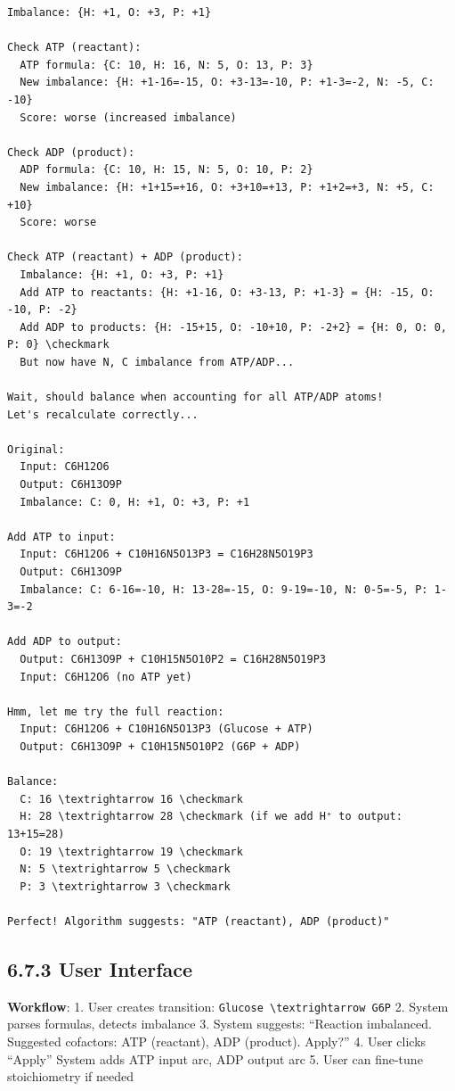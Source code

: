 \begin{lstlisting}
Imbalance: {H: +1, O: +3, P: +1}

Check ATP (reactant):
  ATP formula: {C: 10, H: 16, N: 5, O: 13, P: 3}
  New imbalance: {H: +1-16=-15, O: +3-13=-10, P: +1-3=-2, N: -5, C: -10}
  Score: worse (increased imbalance)

Check ADP (product):
  ADP formula: {C: 10, H: 15, N: 5, O: 10, P: 2}
  New imbalance: {H: +1+15=+16, O: +3+10=+13, P: +1+2=+3, N: +5, C: +10}
  Score: worse

Check ATP (reactant) + ADP (product):
  Imbalance: {H: +1, O: +3, P: +1}
  Add ATP to reactants: {H: +1-16, O: +3-13, P: +1-3} = {H: -15, O: -10, P: -2}
  Add ADP to products: {H: -15+15, O: -10+10, P: -2+2} = {H: 0, O: 0, P: 0} \checkmark
  But now have N, C imbalance from ATP/ADP...
  
Wait, should balance when accounting for all ATP/ADP atoms!
Let's recalculate correctly...

Original:
  Input: C6H12O6
  Output: C6H13O9P
  Imbalance: C: 0, H: +1, O: +3, P: +1

Add ATP to input:
  Input: C6H12O6 + C10H16N5O13P3 = C16H28N5O19P3
  Output: C6H13O9P
  Imbalance: C: 6-16=-10, H: 13-28=-15, O: 9-19=-10, N: 0-5=-5, P: 1-3=-2

Add ADP to output:
  Output: C6H13O9P + C10H15N5O10P2 = C16H28N5O19P3
  Input: C6H12O6 (no ATP yet)
  
Hmm, let me try the full reaction:
  Input: C6H12O6 + C10H16N5O13P3 (Glucose + ATP)
  Output: C6H13O9P + C10H15N5O10P2 (G6P + ADP)
  
Balance:
  C: 16 \textrightarrow 16 \checkmark
  H: 28 \textrightarrow 28 \checkmark (if we add H⁺ to output: 13+15=28)
  O: 19 \textrightarrow 19 \checkmark
  N: 5 \textrightarrow 5 \checkmark
  P: 3 \textrightarrow 3 \checkmark

Perfect! Algorithm suggests: "ATP (reactant), ADP (product)"
\end{lstlisting}

\hypertarget{user-interface}{%
\subsection{6.7.3 User Interface}\label{user-interface}}

\textbf{Workflow}: 1. User creates transition:
\passthrough{\lstinline!Glucose \textrightarrow G6P!} 2. System parses formulas,
detects imbalance 3. System suggests: ``Reaction imbalanced. Suggested
cofactors: ATP (reactant), ADP (product). Apply?'' 4. User clicks
``Apply'' \textrightarrow System adds ATP input arc, ADP output arc 5. User can
fine-tune stoichiometry if needed

